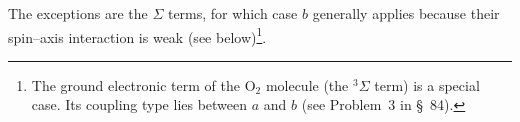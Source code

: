 The exceptions are the $\Sigma$ terms, for which case $b$ generally applies because their spin--axis interaction is weak (see below)\footnote{The ground electronic term of the $\mathrm O_2$ molecule (the ${}^3\Sigma$ term) is a special case. Its coupling type lies between $a$ and $b$ (see Problem~3 in \S~84).}.

